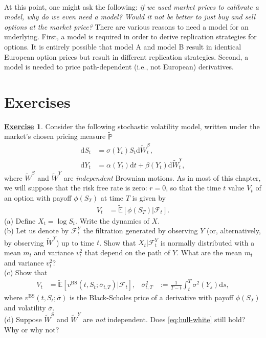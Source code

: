 \documentclass[12pt]{book}
\numberwithin{equation}{chapter}
\theoremstyle{plain}
\numberwithin{theorem}{section}
\theoremstyle{definition}
\newtheorem{exercise}{\underline{Exercise}}
\numberwithin{exercise}{chapter}
\newcommand{\<}{\langle}
\renewcommand{\>}{\rangle}
\renewcommand{\(}{\left(}
\renewcommand{\)}{\right)}
\renewcommand{\[}{\left[}
\renewcommand{\]}{\right]}
\newcommand\Eb{\mathds{E}}
\newcommand\Pb{\mathds{P}}
\newcommand\Fc{\mathscr{F}}
\newcommand\sig{\sigma}
\newcommand\Ebt{\widetilde{\Eb}}
\newcommand\Pbt{\widetilde{\Pb}}
\newcommand\Wt{\widetilde{W}}
\newcommand\dd{\mathrm{d}}
\newcommand\BS{\textrm{BS}}
\theoremstyle{definition}
\numberwithin{question}{section}
\begin{document}
\\[0.5em]
At this point, one might ask the following: \textit{if we used market prices to calibrate a model, why do we even need a model?  Would it not be better to just buy and sell options at the market price?}  There are various reasons to need a model for an underlying.  First, a model is required in order to derive replication strategies for options.  It is entirely possible that model A and model B result in identical European option prices but result in different replication strategies.  Second, a model is needed to price path-dependent (i.e., not European) derivatives.


\section{Exercises}
\label{sec:exer-9}

\begin{exercise}
\label{exer:9-1}
Consider the following stochastic volatility model, written under the market's chosen pricing measure $\Pbt$
\begin{align}
\dd S_t
	&=	\sig(Y_t) S_t \dd \Wt_t^S , \\
\dd Y_t
	&=	\alpha(Y_t) \dd t + \beta(Y_t) \dd \Wt_t^Y ,
\end{align}
where $\Wt^S$ and $\Wt^Y$ are \textit{independent} Brownian motions.  As in most of this chapter, we will suppose that the risk free rate is zero: $r=0$, so that the time $t$ value $V_t$ of an option with payoff $\phi(S_T)$ at time $T$ is given by 
\begin{align}
V_t
	&=	\Ebt [ \phi(S_T) | \Fc_t ] .
\end{align}
(a) Define $X_t = \log S_t$.  Write the dynamics of $X$.\\
(b) Let us denote by $\Fc_t^Y$ the filtration generated by observing $Y$ (or, alternatively, by observing $\Wt^Y$) up to time $t$.  Show that $X_t | \Fc_t^Y$ is normally distributed with a mean $m_t$ and variance $v_t^2$ that depend on the path of $Y$.  What are the mean $m_t$ and variance $v_t^2$?\\
(c) Show that
\begin{align}
V_t
	&=	\Ebt[ v^\BS(t,S_t; \overline{\sig}_{t,T} ) | \Fc_t ] , &
\overline{\sig}_{t,T}^2
	&:=	\frac{1}{T-t} \int_t^T \sig^2(Y_s) \dd s , \label{eq:hull-white}
\end{align}
where $v^\BS(t,S_t;\overline{\sig})$ is the Black-Scholes price of a derivative with payoff $\phi(S_T)$ and volatility $\overline{\sig}$.\\
(d) Suppose $\Wt^S$ and $\Wt^Y$ are \textit{not} independent.  Does \eqref{eq:hull-white} still hold?  Why or why not?
\end{exercise}
\end{document}
